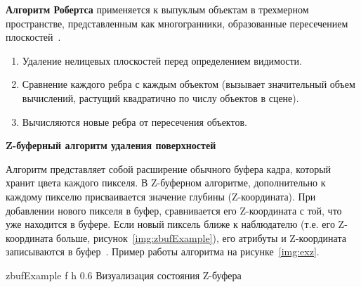 \textbf{Алгоритм Робертса} применяется к выпуклым объектам в трехмерном пространстве, представленным как многогранники, образованные пересечением плоскостей~\cite{del_line}.

\begin{enumerate}
	\item Удаление нелицевых плоскостей перед определением видимости.
	\item Сравнение каждого ребра с каждым объектом (вызывает значительный объем вычислений, растущий квадратично по числу объектов в сцене).
	\item Вычисляются новые ребра от пересечения объектов. 
\end{enumerate}
	





\textbf{Z-буферный алгоритм удаления поверхностей}

Алгоритм представляет собой расширение обычного буфера кадра, который хранит цвета каждого пикселя.
В Z-буферном алгоритме, дополнительно к каждому пикселю присваивается значение глубины (Z-координата).
При добавлении нового пикселя в буфер, сравнивается его Z-координата с той, что уже находится в буфере.
Если новый пиксель ближе к наблюдателю (т.е. его Z-координата больше, рисунок~\ref{img:zbufExample}), его атрибуты и Z-координата записываются в буфер~\cite{del_line}.
Пример работы алгоритма на рисунке~\ref{img:exz}. 
	
	{zbufExample} %
	{f} %
	{h} %
	{0.6\textwidth} %
	{Визуализация состояния Z-буфера} %

